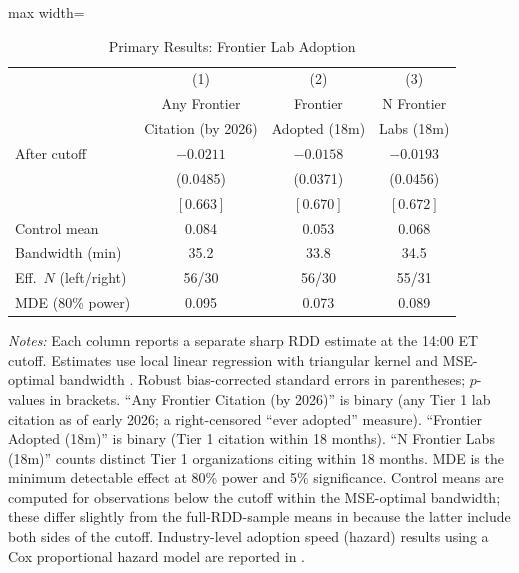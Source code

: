 \begin{table}[htbp]
\centering
\caption{Primary Results: Frontier Lab Adoption}
\label{tab:adoption}
\begin{adjustbox}{max width=\textwidth}
\begin{tabular}{lccc}
\hline\hline
& (1) & (2) & (3) \\
& Any Frontier & Frontier & N Frontier \\
& Citation (by 2026) & Adopted (18m) & Labs (18m) \\
\hline
After cutoff & $-0.0211$ & $-0.0158$ & $-0.0193$ \\
& (0.0485) & (0.0371) & (0.0456) \\
& $[0.663]$ & $[0.670]$ & $[0.672]$ \\[6pt]
Control mean & 0.084 & 0.053 & 0.068 \\
Bandwidth (min) & 35.2 & 33.8 & 34.5 \\
Eff.\ $N$ (left/right) & 56/30 & 56/30 & 55/31 \\
MDE (80\% power) & 0.095 & 0.073 & 0.089 \\
\hline\hline
\end{tabular}
\end{adjustbox}
\begin{minipage}{0.95\textwidth}
\footnotesize
\textit{Notes:} Each column reports a separate sharp RDD estimate at the 14:00 ET cutoff. Estimates use local linear regression with triangular kernel and MSE-optimal bandwidth \citep{calonico2014}. Robust bias-corrected standard errors in parentheses; $p$-values in brackets. ``Any Frontier Citation (by 2026)'' is binary (any Tier 1 lab citation as of early 2026; a right-censored ``ever adopted'' measure). ``Frontier Adopted (18m)'' is binary (Tier 1 citation within 18 months). ``N Frontier Labs (18m)'' counts distinct Tier 1 organizations citing within 18 months. MDE is the minimum detectable effect at 80\% power and 5\% significance. Control means are computed for observations below the cutoff within the MSE-optimal bandwidth; these differ slightly from the full-RDD-sample means in  because the latter include both sides of the cutoff. Industry-level adoption speed (hazard) results using a Cox proportional hazard model are reported in .
\end{minipage}
\end{table}
